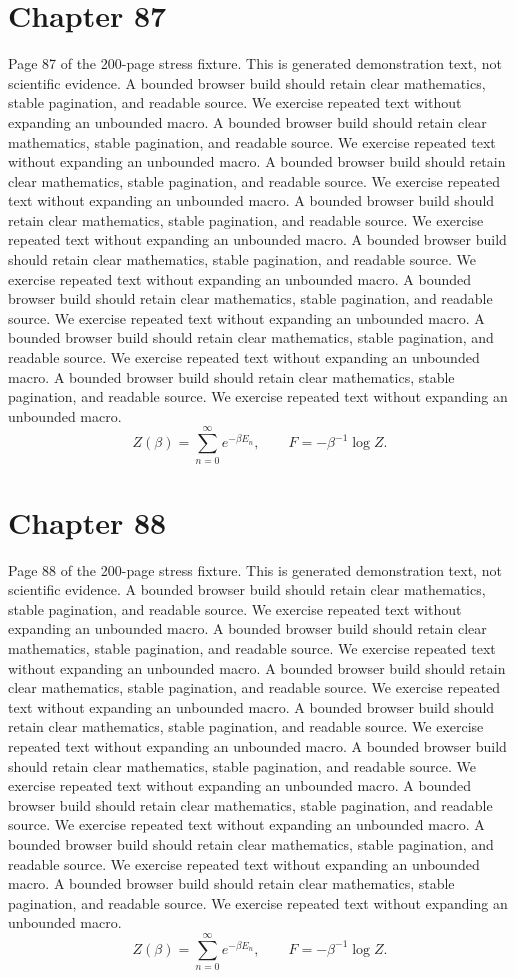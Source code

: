 \documentclass[11pt]{article}
\begin{document}
\section*{Chapter 87}
Page 87 of the 200-page stress fixture. This is generated demonstration text, not scientific evidence.
A bounded browser build should retain clear mathematics, stable pagination, and readable source. We exercise repeated text without expanding an unbounded macro.
A bounded browser build should retain clear mathematics, stable pagination, and readable source. We exercise repeated text without expanding an unbounded macro.
A bounded browser build should retain clear mathematics, stable pagination, and readable source. We exercise repeated text without expanding an unbounded macro.
A bounded browser build should retain clear mathematics, stable pagination, and readable source. We exercise repeated text without expanding an unbounded macro.
A bounded browser build should retain clear mathematics, stable pagination, and readable source. We exercise repeated text without expanding an unbounded macro.
A bounded browser build should retain clear mathematics, stable pagination, and readable source. We exercise repeated text without expanding an unbounded macro.
A bounded browser build should retain clear mathematics, stable pagination, and readable source. We exercise repeated text without expanding an unbounded macro.
A bounded browser build should retain clear mathematics, stable pagination, and readable source. We exercise repeated text without expanding an unbounded macro.
\[Z(\beta)=\sum_{n=0}^{\infty}e^{-\beta E_n},\qquad F=-\beta^{-1}\log Z.\]
\newpage
\section*{Chapter 88}
Page 88 of the 200-page stress fixture. This is generated demonstration text, not scientific evidence.
A bounded browser build should retain clear mathematics, stable pagination, and readable source. We exercise repeated text without expanding an unbounded macro.
A bounded browser build should retain clear mathematics, stable pagination, and readable source. We exercise repeated text without expanding an unbounded macro.
A bounded browser build should retain clear mathematics, stable pagination, and readable source. We exercise repeated text without expanding an unbounded macro.
A bounded browser build should retain clear mathematics, stable pagination, and readable source. We exercise repeated text without expanding an unbounded macro.
A bounded browser build should retain clear mathematics, stable pagination, and readable source. We exercise repeated text without expanding an unbounded macro.
A bounded browser build should retain clear mathematics, stable pagination, and readable source. We exercise repeated text without expanding an unbounded macro.
A bounded browser build should retain clear mathematics, stable pagination, and readable source. We exercise repeated text without expanding an unbounded macro.
A bounded browser build should retain clear mathematics, stable pagination, and readable source. We exercise repeated text without expanding an unbounded macro.
\[Z(\beta)=\sum_{n=0}^{\infty}e^{-\beta E_n},\qquad F=-\beta^{-1}\log Z.\]
\newpage
\end{document}
